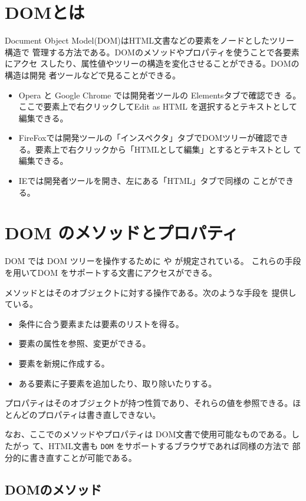 \section{DOMとは}
Document Object Model(DOM)はHTML文書などの要素をノードとしたツリー構造で
管理する方法である。DOMのメソッドやプロパティを使うことで各要素にアクセ
スしたり、属性値やツリーの構造を変化させることができる。DOMの構造は開発
者ツールなどで見ることができる。
\begin{itemize}
 \item Opera と Google Chrome では開発者ツールの Elementsタブで確認でき
       る。ここで要素上で右クリックしてEdit as HTML
       を選択するとテキストとして編集できる。
 \item FireFoxでは開発ツールの「インスペクタ」タブでDOMツリーが確認でき
       る。要素上で右クリックから「HTMLとして編集」とするとテキストとし
       て編集できる。 
 \item IEでは開発者ツールを開き、左にある「HTML」タブで同様の
       ことができる。
\end{itemize}
\newcommand{\DOMM}{\texttt}
\newcommand{\DOMP}{\texttt}
\newcommand{\DOM}{\texttt{DOM}}
\newcommand{\keyitem}{\relax}
\newcommand{\HTML}{HTML文書}
\section{DOM のメソッドとプロパティ}
DOM では DOM ツリーを操作するために%
\keyitem{メソッド}や
\keyitem{プロパティ}が規定されている。
これらの手段を用いてDOM をサポートする文書にアクセスができる。

 メソッドとはそのオブジェクトに対する操作である。次のような手段を
       提供している。
\begin{itemize}
 \item 条件に合う要素または要素のリストを得る。
 \item 要素の属性を参照、変更ができる。
 \item 要素を新規に作成する。
 \item ある要素に子要素を追加したり、取り除いたりする。
\end{itemize}
プロパティはそのオブジェクトが持つ性質であり、それらの値を参照できる。ほ
とんどのプロパティは書き直しできない。

なお、ここでのメソッドやプロパティは DOM文書で使用可能なものである。したがっ
て、\HTML も \DOM{} をサポートするブラウザであれば同様の方法で
部分的に書き直すことが可能である。
\subsection{DOMのメソッド}


